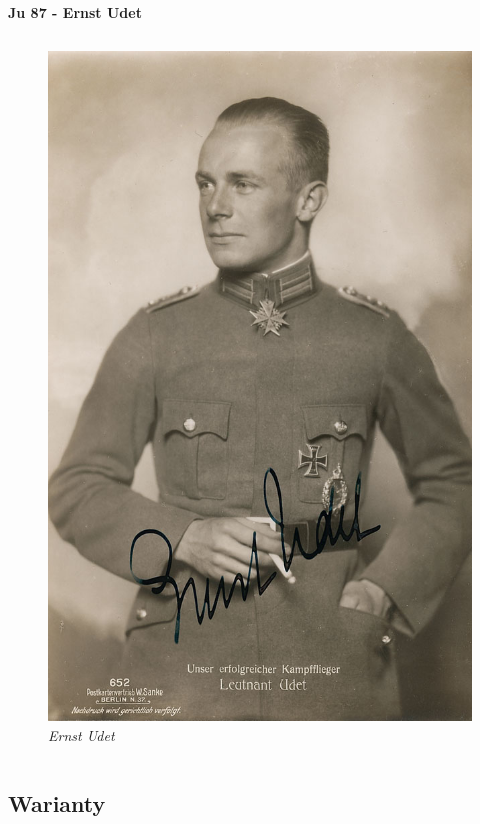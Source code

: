 \begin{frame}{\Huge{\textbf{Ju 87 - Ernst Udet}}}
\begin{columns}[t]
			\begin{figure}
				\centering
				\includegraphics[scale=0.18]{images/ju87-02.jpg}
				\caption{\textit{Ernst Udet}}
			\end{figure}
	\end{columns}
\end{frame}



\subsection{Warianty}


